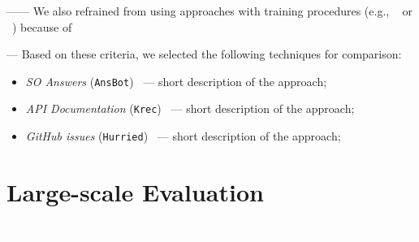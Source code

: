 ------ We also refrained from using approaches with training procedures (e.g., ~\cite{liu2020} or ~\cite{Treude2016}) because of ~\cite{Chaparro2017, fucci2019} \vspace{3mm}


--- Based on these criteria, we selected the following techniques for comparison:


\begin{itemize}[leftmargin=\parindent, font=\normalfont\itshape]
    \item \textit{SO Answers} (\texttt{\acs{AnsBot}})~\cite{Xu2017} --- short description of the approach;
    
    \item \textit{API Documentation} (\texttt{\acs{Krec}})~\cite{Robillard2015} --- short description of the approach;
    
    \item \textit{GitHub issues} (\texttt{\acs{Hurried}})~\cite{Lotufo2012} --- short description of the approach;

\end{itemize}










\section{Large-scale Evaluation}
\textcolor{white}{force ident} %





